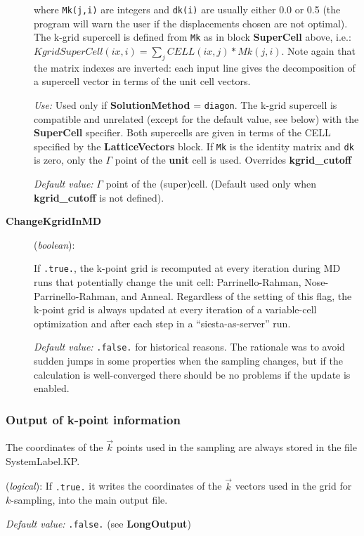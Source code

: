 \documentclass[11pt]{article}
\begin{document}
\begin{description}
where {\tt Mk(j,i)} are integers and {\tt dk(i)} are usually
either 0.0 or 0.5 (the program will warn the user if the displacements
chosen are not optimal).
The k-grid supercell is defined from {\tt Mk}
as in block {\bf SuperCell} above, i.e.:
$KgridSuperCell(ix,i) = \sum_j CELL(ix,j)*Mk(j,i)$.
Note again that the matrix indexes are inverted: each input line
gives the decomposition of a supercell vector in terms of the unit
cell vectors.


{\it Use:} Used only if {\bf SolutionMethod} = {\tt diagon}.
The k-grid supercell is compatible and unrelated
(except for the default value, see below)
with the {\bf SuperCell} specifier. Both supercells are given in
terms of the CELL specified by the {\bf LatticeVectors} block.
If {\tt Mk} is the identity matrix and {\tt dk}
is zero, only the $\Gamma$ point of the {\bf unit} cell is used.
Overrides {\bf kgrid\_cutoff}

{\it Default value:} $\Gamma$ point of the (super)cell.
(Default used only when {\bf kgrid\_cutoff} is not defined).

\item[{\bf ChangeKgridInMD}] ({\it boolean}):

If {\tt .true.}, the k-point grid is
recomputed at every iteration during MD runs that potentially
change the unit cell: Parrinello-Rahman, Nose-Parrinello-Rahman, and
Anneal. Regardless of the setting of this flag, the k-point grid
is always updated at every iteration of a variable-cell optimization
and after each step in a ``siesta-as-server'' run.

{\it Default value:} {\tt .false.} for historical reasons. The
rationale was to avoid sudden jumps in some properties when the
sampling changes, but if the calculation is well-converged there
should be no problems if the update is enabled.

\end{description}

\subsubsection{Output of k-point information}

The coordinates of the $\vec k$ points used in the sampling
are always stored in the file SystemLabel.KP.

\begin{description}
\itemsep 10pt
\parsep 0pt
\item[{\bf WriteKpoints}] ({\it logical}):
If {\tt .true.} it writes the coordinates of the $\vec k$ vectors
used in the grid for $k$-sampling, into the main output file.

{\it Default value:} {\tt .false.} (see {\bf LongOutput})

\end{description}
\end{document}
